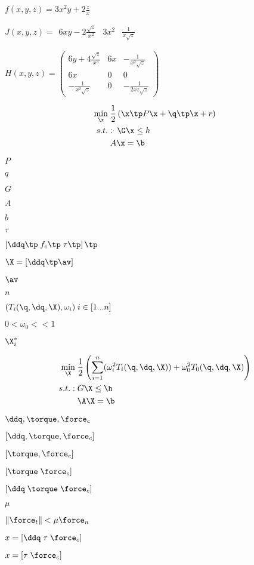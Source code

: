 \documentclass{article}
\begin{document}
$ f(x,y,z) = 3x^2y+2\frac{z}{x}$
\pagebreak

$J(x,y,z) = \begin{array}{lcr} 6xy - 2 \frac{\sqrt{z}}{x^2} & 3x^2 & \frac{1}{x \sqrt{z}} \end{array} $
\pagebreak

$ H(x,y,z) = \left(\begin{array}{lcr} 6y + 4\frac{\sqrt{z}}{x^3} & 6x & -\frac{1}{x^2 \sqrt{z}} \\ 6x & 0 & 0 \\ -\frac{1}{x^2 \sqrt{z}} & 0 & -\frac{1}{2xz \sqrt{z}} \end{array}\right) $
\pagebreak

\begin{align*} \underset{\x}{\text{min}} &\; \frac{1}{2} \left( \x\tp P \x + \q\tp\x + r \right) \\ s.t. &:\; \G\x \leq h \\ &\; A\x = \b \end{align*}
\pagebreak

$ P $
\pagebreak

$ q $
\pagebreak

$ G $
\pagebreak

$ A $
\pagebreak

$ b $
\pagebreak

$ \tau $
\pagebreak

$ \left[ \ddq \tp \; f_c \tp \; \tau \tp \right] \tp $
\pagebreak

$ \X = [\ddq\tp \av] $
\pagebreak

$ \av $
\pagebreak

$ n $
\pagebreak

$ (T_i(\q, \dq, \X), \omega_i) \; i \in [1...n] $
\pagebreak

$ 0 < \omega_0 << 1 $
\pagebreak

$\X_i^*$
\pagebreak

\begin{align*} \underset{\X}{\text{min}} &\; \frac{1}{2} \left( \sum_{i=1}^{n} (\omega_i^2 T_i (\q, \dq, \X)) + \omega_0^2 T_0(\q, \dq, \X) \right) \\ s.t.: &\; G \X \leq \h \\ &\; \A \X = \b \end{align*}
\pagebreak

$ \ddq, \torque, \force_c $
\pagebreak

$ [ \ddq, \torque, \force_c ] $
\pagebreak

$ [ \torque, \force_c ] $
\pagebreak

$ [ \torque \; \force_c ] $
\pagebreak

$ [ \ddq \; \torque \; \force_c ] $
\pagebreak

$ \mu $
\pagebreak

$ \Vert \force_t \Vert < \mu \force_n $
\pagebreak

$ x = [ \ddq \; \tau \; \force_c ] $
\pagebreak

$ x = [ \tau \; \force_c ] $
\pagebreak
\end{document}
